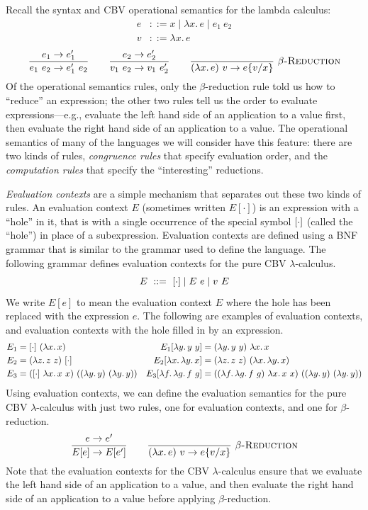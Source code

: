 Recall the syntax and CBV operational semantics for the lambda calculus:
\begin{align*}
  e&::=x\mid\lambda x.\,e\mid e_1\ e_2\\
  v&::=\lambda x.\,e
\end{align*}
\[
  \rul{e_1\to e_1'}{e_1\ e_2\to e_1'\ e_2}
  \qquad
  \rul{e_2\to e_2'}{v_1\ e_2\to v_1\ e_2'}
  \qquad
  \infr{}{(\lambda x.\,e)\ v\to\sub{e}{v}{x}}{$\beta$-Reduction}
\]
Of the operational semantics rules, only the $\beta$-reduction rule told us how to ``reduce'' an
expression; the other two rules tell us the order to evaluate expressions---e.g., evaluate the left
hand side of an application to a value first, then evaluate the right hand side of an application
to a value. The operational semantics of many of the languages we will consider have this feature:
there are two kinds of rules, \emph{congruence rules} that specify evaluation order, and the
\emph{computation rules} that specify the ``interesting'' reductions.

\emph{Evaluation contexts} are a simple mechanism that separates out these two kinds of rules. An
evaluation context $E$ (sometimes written $E[\cdot]$) is an expression with a ``hole'' in it, that
is with a single occurrence of the special symbol $[\cdot]$ (called the ``hole'') in place of a
subexpression. Evaluation contexts are defined using a BNF grammar that is similar to the grammar
used to define the language. The following grammar defines evaluation contexts for the pure CBV
$\lambda$-calculus.
\[
  E\ ::=\ [\cdot]\mid E\ e\mid v\ E
\]
We write $E[e]$ to mean the evaluation context $E$ where the hole has been replaced with the
expression $e$. The following are examples of evaluation contexts, and evaluation contexts with
the hole filled in by an expression.
\begin{align*}
  E_1&=\hole\ (\lambda x.\,x) & E_1[\lambda y.\,y\ y]&=(\lambda y.\,y\ y)\ \lambda x.\,x\\
  E_2&=(\lambda z.\,z\ z)\ \hole & E_2[\lambda x.\,\lambda y.\,x]&=(\lambda z.\,z\ z)\ (\lambda x.\,\lambda y.\,x)\\
  E_3&=(\hole\ \lambda x.\,x\ x)\ ((\lambda y.\,y)\ (\lambda y.\,y)) & E_3[\lambda f.\,\lambda g.\,f\ g]&=((\lambda f.\,\lambda g.\,f\ g)\ \lambda x.\,x\ x)\ ((\lambda y.\,y)\ (\lambda y.\,y))
\end{align*}
Using evaluation contexts, we can define the evaluation semantics for the pure CBV $\lambda$-calculus
with just two rules, one for evaluation contexts, and one for $\beta$-reduction.
\[
  \rul{e\to e'}{E[e]\to E[e']}
  \qquad
  \infr{}{(\lambda x.\,e)\ v\to\sub{e}{v}{x}}{$\beta$-Reduction}
\]
Note that the evaluation contexts for the CBV $\lambda$-calculus ensure that we evaluate the left
hand side of an application to a value, and then evaluate the right hand side of an application to a
value before applying $\beta$-reduction.

